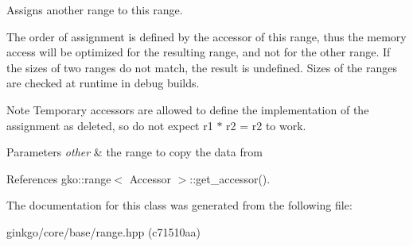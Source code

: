 Assigns another range to this range. 

The order of assignment is defined by the accessor of this range, thus the memory access will be optimized for the resulting range, and not for the other range. If the sizes of two ranges do not match, the result is undefined. Sizes of the ranges are checked at runtime in debug builds.

\begin{DoxyNote}{Note}
Temporary accessors are allowed to define the implementation of the assignment as deleted, so do not expect {\ttfamily r1 $\ast$ r2 = r2} to work.
\end{DoxyNote}

\begin{DoxyParams}{Parameters}
{\em other} & the range to copy the data from \\
\hline
\end{DoxyParams}


References gko\+::range$<$ Accessor $>$\+::get\+\_\+accessor().



The documentation for this class was generated from the following file\+:\begin{DoxyCompactItemize}
\item 
ginkgo/core/base/range.\+hpp (c71510aa)\end{DoxyCompactItemize}

